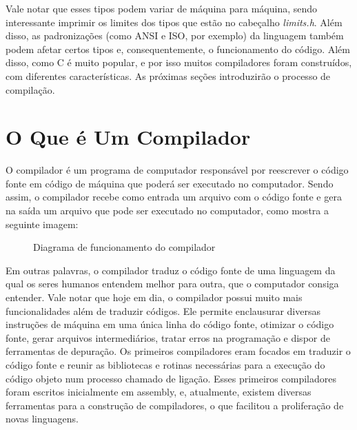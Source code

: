 Vale notar que esses tipos podem variar de máquina para máquina, sendo interessante imprimir os limites dos tipos que estão no cabeçalho \textit{limits.h}. Além disso, as padronizações (como ANSI e ISO, por exemplo) da linguagem também podem afetar certos tipos e, consequentemente, o funcionamento do código. Além disso, como C é muito popular, e por isso muitos compiladores foram construídos, com diferentes características. As próximas seções introduzirão o processo de compilação.

\section{O Que é Um Compilador}
O compilador é um programa de computador responsável por reescrever o código fonte em código de máquina que poderá ser executado no computador. Sendo assim, o compilador recebe como entrada um arquivo com o código fonte e gera na saída um arquivo que pode ser executado no computador, como mostra a seguinte imagem:
\begin{figure}[!htbp]\label{fig1_1}
    \centering
    \caption{Diagrama de funcionamento do compilador}
\end{figure}

Em outras palavras, o compilador traduz o código fonte de uma linguagem da qual os seres humanos entendem melhor para outra, que o computador consiga entender. Vale notar que hoje em dia, o compilador possui muito mais funcionalidades além de traduzir códigos. Ele permite enclausurar diversas instruções de máquina em uma única linha do código fonte, otimizar o código fonte, gerar arquivos intermediários, tratar erros na programação e dispor de ferramentas de depuração. Os primeiros compiladores eram focados em traduzir o código fonte e reunir as bibliotecas e rotinas necessárias para a execução do código objeto num processo chamado de ligação. Esses primeiros compiladores foram escritos inicialmente em \gls{assembly}, e, atualmente, existem diversas ferramentas para a construção de compiladores, o que facilitou a proliferação de novas linguagens.

